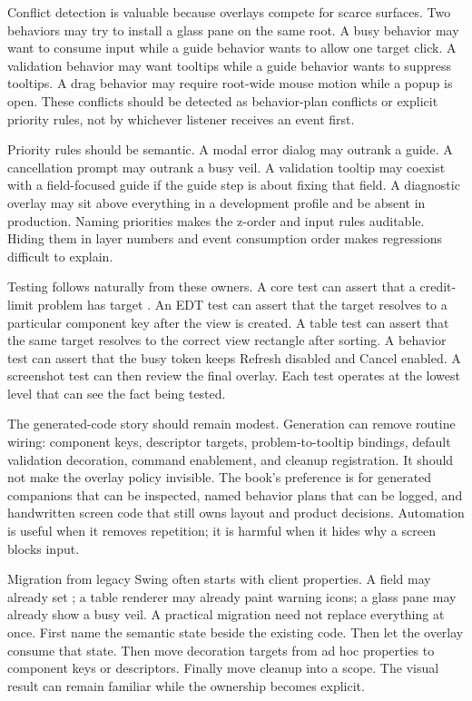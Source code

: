 Conflict detection is valuable because overlays compete for scarce surfaces.
Two behaviors may try to install a glass pane on the same root. A busy behavior
may want to consume input while a guide behavior wants to allow one target
click. A validation behavior may want tooltips while a guide behavior wants to
suppress tooltips. A drag behavior may require root-wide mouse motion while a
popup is open. These conflicts should be detected as behavior-plan conflicts or
explicit priority rules, not by whichever listener receives an event first.

Priority rules should be semantic. A modal error dialog may outrank a guide.
A cancellation prompt may outrank a busy veil. A validation tooltip may
coexist with a field-focused guide if the guide step is about fixing that
field. A diagnostic overlay may sit above everything in a development profile
and be absent in production. Naming priorities makes the z-order and input
rules auditable. Hiding them in layer numbers and event consumption order makes
regressions difficult to explain.

Testing follows naturally from these owners. A core test can assert that a
credit-limit problem has target . An EDT test can
assert that the target resolves to a particular component key after the view is
created. A table test can assert that the same target resolves to the correct
view rectangle after sorting. A behavior test can assert that the busy token
keeps Refresh disabled and Cancel enabled. A screenshot test can then review
the final overlay. Each test operates at the lowest level that can see the fact
being tested.

The generated-code story should remain modest. Generation can remove routine
wiring: component keys, descriptor targets, problem-to-tooltip bindings,
default validation decoration, command enablement, and cleanup registration.
It should not make the overlay policy invisible. The book's preference is for
generated companions that can be inspected, named behavior plans that can be
logged, and handwritten screen code that still owns layout and product
decisions. Automation is useful when it removes repetition; it is harmful when
it hides why a screen blocks input.

Migration from legacy Swing often starts with client properties. A field may
already set ; a table renderer may already paint warning
icons; a glass pane may already show a busy veil. A practical migration need
not replace everything at once. First name the semantic state beside the
existing code. Then let the overlay consume that state. Then move decoration
targets from ad hoc properties to component keys or descriptors. Finally move
cleanup into a scope. The visual result can remain familiar while the ownership
becomes explicit.

